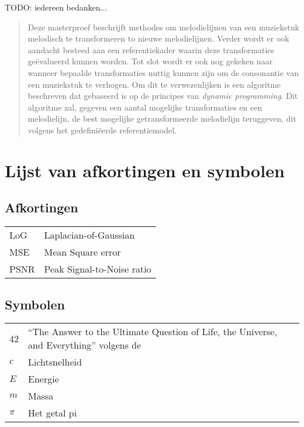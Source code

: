 \documentclass[master=cws]{kulemt}
\begin{document}
\begin{preface}
  TODO: iedereen bedanken...
\end{preface}

\tableofcontents*

\begin{abstract}
  Deze masterproef beschrijft methodes om melodielijnen van een muziekstuk melodisch te transformeren to nieuwe melodielijnen. Verder wordt er ook aandacht besteed aan een referentiekader waarin deze transformaties ge\"evalueerd kunnen worden. Tot slot wordt er ook nog gekeken naar wanneer bepaalde transformaties nuttig kunnen zijn om de consonantie van een muziekstuk te verhogen. Om dit te verwezenlijken is een algoritme beschreven dat gebaseerd is op de principes van \textit{dynamic programming}. Dit algoritme zal, gegeven een aantal mogelijke transformaties en een melodielijn, de best mogelijke getransformeerde melodielijn teruggeven, dit volgens het gedefini\"eerde referentiemodel.
\end{abstract}

\listoffiguresandtables
\chapter{Lijst van afkortingen en symbolen}
\section*{Afkortingen}
\begin{flushleft}
  \renewcommand{\arraystretch}{1.1}
  \begin{tabularx}{\textwidth}{@{}p{12mm}X@{}}
    LoG   & Laplacian-of-Gaussian \\
    MSE   & Mean Square error \\
    PSNR  & Peak Signal-to-Noise ratio \\
  \end{tabularx}
\end{flushleft}
\section*{Symbolen}
\begin{flushleft}
  \renewcommand{\arraystretch}{1.1}
  \begin{tabularx}{\textwidth}{@{}p{12mm}X@{}}
    42    & ``The Answer to the Ultimate Question of Life, the Universe,
            and Everything'' volgens de \cite{h2g2} \\
    $c$   & Lichtsnelheid \\
    $E$   & Energie \\
    $m$   & Massa \\
    $\pi$ & Het getal pi \\
  \end{tabularx}
\end{flushleft}
\end{document}
